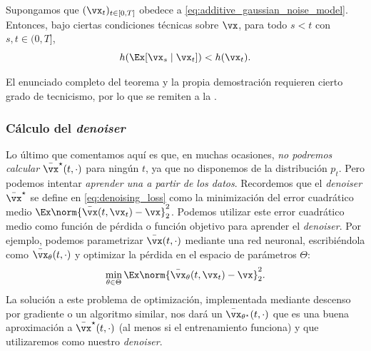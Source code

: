 \documentclass[../../book-main.tex]{subfiles}
\begin{document}
\begin{theorem}
    Supongamos que \((\vx_{t})_{t \in [0, T]}\) obedece a
    \eqref{eq:additive_gaussian_noise_model}. Entonces, bajo ciertas
    condiciones técnicas sobre \(\vx\), para todo \(s < t\) con \(s, t
    \in (0, T]\),
    \begin{equation}
        h(\Ex[\vx_{s} \mid \vx_{t}]) < h(\vx_{t}).
    \end{equation}
\end{theorem}
El enunciado completo del teorema y la propia demostración requieren
cierto grado de tecnicismo, por lo que se remiten a la .

\subsubsection{Cálculo del \textit{denoiser}}
Lo último que comentamos aquí es que, en muchas ocasiones,
\textit{no podremos calcular} \(\bar{\vx}^{\star}(t, \cdot)\) para
ningún \(t\), ya que no disponemos de la distribución \(p_{t}\). Pero podemos
intentar \textit{aprender una a partir de los datos}. Recordemos que el \textit{denoiser}
\(\bar{\vx}^{\star}\) se define en \eqref{eq:denoising_loss} como
la minimización del error cuadrático medio \(\Ex\norm{\bar{\vx}(t, \vx_{t}) -
\vx}_{2}^{2}\). Podemos utilizar este error cuadrático medio como función de pérdida o
función objetivo para aprender el \textit{denoiser}. Por ejemplo, podemos
parametrizar \(\bar{\vx}(t, \cdot)\) mediante una red neuronal, escribiéndola
como \(\bar{\vx}_{\theta}(t, \cdot)\) y optimizar la pérdida en el
espacio de parámetros \(\Theta\):
\begin{equation}
    \min_{\theta \in \Theta}\Ex\norm{\bar{\vx}_{\theta}(t, \vx_{t}) -
    \vx}_{2}^{2}.
\end{equation}
La solución a este problema de optimización, implementada mediante descenso por gradiente
o un algoritmo similar, nos dará un
\(\bar{\vx}_{\theta^{\star}}(t, \cdot)\) que es una buena aproximación
a \(\bar{\vx}^{\star}(t, \cdot)\) (al menos si el entrenamiento funciona)
y que utilizaremos como nuestro \textit{denoiser}.
\end{document}
